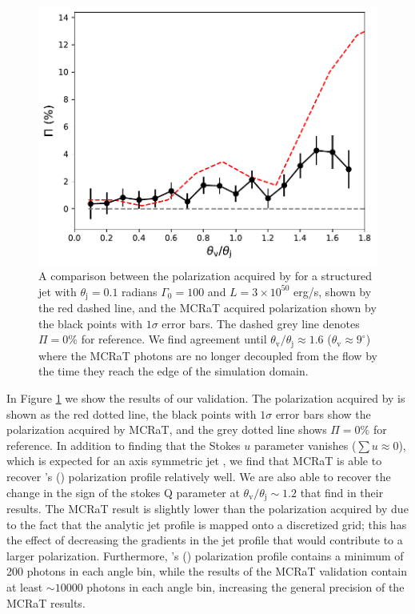 \documentclass[12pt,a4paper]{article}
\begin{document}
\begin{figure}
\centering
\includegraphics[width=\linewidth]{comp_lundman_p_4_thetaj_1e-01.pdf}
\caption{A comparison between the polarization acquired by \cite{lundman2014polarization} for a structured jet with $\theta_{\mathrm{j}}=0.1$ radians $\Gamma_0=100$ and $L=3 \times 10^{50}$ erg/s, shown by the {red} dashed line, and the MCRaT acquired polarization shown by the black points with $1\sigma$ error bars. The dashed grey line denotes $\Pi=0\%$ for reference. We find agreement until  $\theta_{\mathrm{v}}/\theta_{\mathrm{j}} \approx 1.6$ ($\theta_{\mathrm{v}} \approx 9^\circ$) where the MCRaT photons are no longer decoupled from the flow by the time they reach the edge of the simulation domain. }
\label{fig:complundmanp4thetaj1}
\end{figure}

In Figure \ref{fig:complundmanp4thetaj1} we show the results of our validation. The polarization acquired by \cite{lundman2014polarization} is shown as the red dotted line, the black points with $1\sigma$ error bars show the polarization acquired by MCRaT, and the grey dotted line shows $\Pi=0\%$ for reference. In addition to finding that the Stokes $u$ parameter vanishes ($\sum u \approx 0$), which is expected for an axis symmetric jet \citep{ito_polarization, lundman2014polarization}, we find that MCRaT is able to recover \citeauthor{lundman2014polarization}'s (\citeyear{lundman2014polarization}) polarization profile relatively well. {We are also able to recover the change in the sign of the stokes Q parameter at $\theta_{\mathrm{v}}/\theta_{\mathrm{j}} \sim 1.2$ that \cite{lundman2014polarization} find in their results.
The MCRaT result is slightly lower than the polarization acquired by \cite{lundman2014polarization} due to the fact that the analytic jet profile is mapped onto a discretized grid; this has the effect of decreasing the gradients in the jet profile that would contribute to a larger polarization. 
Furthermore, \citeauthor{lundman2014polarization}'s (\citeyear{lundman2014polarization}) polarization profile contains a minimum of 200 photons in each angle bin, while the results of the MCRaT validation contain at least $\sim 10000$ photons in each angle bin, increasing the general precision of the MCRaT results. }
\end{document}
